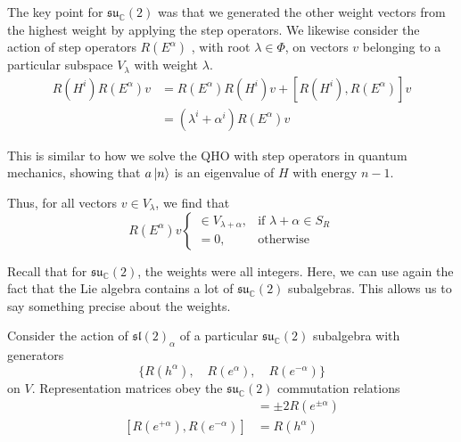 The key point for $\mathfrak{su}_{\mathbb{C}}(2)$ was that we generated the other weight vectors from the highest weight by applying the step operators.
We likewise consider the action of step operators $R(E^{\alpha})$ , with root $\lambda \in \Phi$, on vectors  $v$ belonging to a particular subspace  $V_\lambda$ with weight  $\lambda$.
 \begin{align}
  R(H^{i}) R(E^\alpha) v &=  R(E^\alpha) R(H^{i}) v + [R(H^{i}), R(E^{\alpha})] v \\
			 &= (\lambda^i+ \alpha^i) R(E^\alpha) v
\end{align}
\begin{leftbar}
  \begin{note}
    This is similar to how we solve the QHO with step operators in quantum mechanics, showing that $a \ket{n}$ is an eigenvalue of $H$ with energy $n - 1$.
  \end{note}
\end{leftbar}
Thus, for all vectors $v \in V_\lambda$, we find that
\begin{equation}
  R(E^\alpha) v 
  \begin{cases}
    \in V_{\lambda + \alpha}, & \text{if } \lambda + \alpha \in S_R \\
    = 0, & \text{otherwise}
  \end{cases}
\end{equation}

Recall that for $\mathfrak{su}_{\mathbb{C}}(2)$, the weights were all integers.
Here, we can use again the fact that the Lie algebra contains a lot of $\mathfrak{su}_{\mathbb{C}}(2)$ subalgebras.
This allows us to say something precise about the weights.

Consider the action of $\mathfrak{sl}(2)_\alpha$ of a particular $\mathfrak{su}_{\mathbb{C}}(2)$  subalgebra
with generators
\begin{equation}
  \{R(h^\alpha), \quad R(e^{\alpha}), \quad R(e^{-\alpha}) \} 
\end{equation}
on $V$.
Representation matrices obey the  $\mathfrak{su}_{\mathbb{C}}(2)$  commutation relations
\begin{align}
  [R(h^\alpha), R(e^{\pm \alpha})] &= \pm 2 R(e^{\pm \alpha}) \\
  [R(e^{+\alpha}), R(e^{- \alpha})] &= R(h^\alpha) \\
\end{align}

